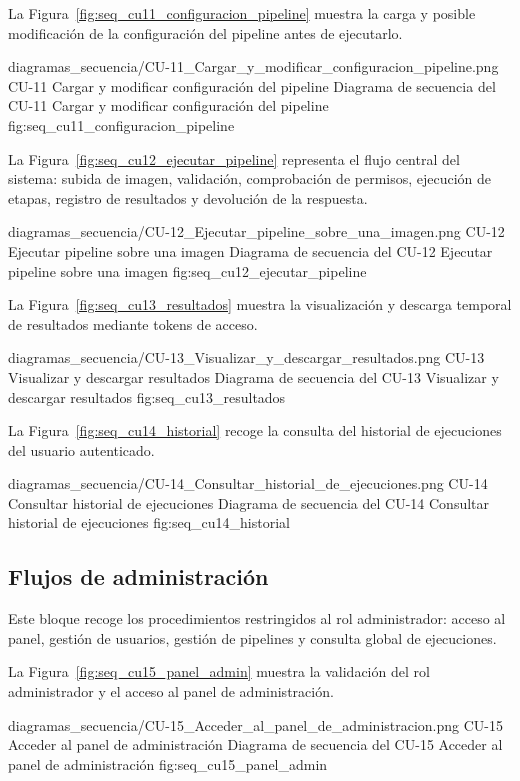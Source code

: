 La Figura~\ref{fig:seq_cu11_configuracion_pipeline} muestra la carga y posible modificación de la configuración del pipeline antes de ejecutarlo.

\diagramaSecuencia
{diagramas_secuencia/CU-11_Cargar_y_modificar_configuracion_pipeline.png}
{CU-11 Cargar y modificar configuración del pipeline}
{Diagrama de secuencia del CU-11 Cargar y modificar configuración del pipeline}
{fig:seq_cu11_configuracion_pipeline}

La Figura~\ref{fig:seq_cu12_ejecutar_pipeline} representa el flujo central del sistema: subida de imagen, validación, comprobación de permisos, ejecución de etapas, registro de resultados y devolución de la respuesta.

\diagramaSecuenciaGrande
{diagramas_secuencia/CU-12_Ejecutar_pipeline_sobre_una_imagen.png}
{CU-12 Ejecutar pipeline sobre una imagen}
{Diagrama de secuencia del CU-12 Ejecutar pipeline sobre una imagen}
{fig:seq_cu12_ejecutar_pipeline}

La Figura~\ref{fig:seq_cu13_resultados} muestra la visualización y descarga temporal de resultados mediante tokens de acceso.

\diagramaSecuencia
{diagramas_secuencia/CU-13_Visualizar_y_descargar_resultados.png}
{CU-13 Visualizar y descargar resultados}
{Diagrama de secuencia del CU-13 Visualizar y descargar resultados}
{fig:seq_cu13_resultados}

La Figura~\ref{fig:seq_cu14_historial} recoge la consulta del historial de ejecuciones del usuario autenticado.

\diagramaSecuencia
{diagramas_secuencia/CU-14_Consultar_historial_de_ejecuciones.png}
{CU-14 Consultar historial de ejecuciones}
{Diagrama de secuencia del CU-14 Consultar historial de ejecuciones}
{fig:seq_cu14_historial}

\subsection{Flujos de administración}

Este bloque recoge los procedimientos restringidos al rol administrador: acceso al panel, gestión de usuarios, gestión de pipelines y consulta global de ejecuciones.

La Figura~\ref{fig:seq_cu15_panel_admin} muestra la validación del rol administrador y el acceso al panel de administración.

\diagramaSecuencia
{diagramas_secuencia/CU-15_Acceder_al_panel_de_administracion.png}
{CU-15 Acceder al panel de administración}
{Diagrama de secuencia del CU-15 Acceder al panel de administración}
{fig:seq_cu15_panel_admin}

